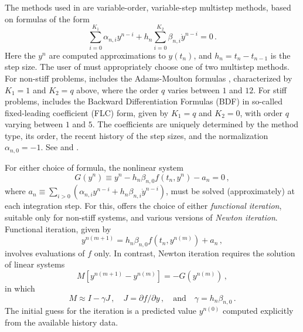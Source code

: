 The methods used in {\cvodes} are variable-order, variable-step multistep
methods, based on formulas of the form
\begin{equation}\label{e:lmm}
 \sum_{i = 0}^{K_1} \alpha_{n,i} y^{n-i} + 
     h_n \sum_{i = 0}^{K_2} \beta_{n,i} {{\dot y}}^{n-i} = 0 \, .
\end{equation}
Here the $y^n$ are computed approximations to $y(t_n)$, and
$h_n = t_n - t_{n-1}$ is the step size.  The user of {\cvodes} must
appropriately choose one of two multistep methods.  For non-stiff problems,
{\cvodes} includes the Adams-Moulton formulas ,
characterized by $K_1 = 1$
and $K_2 = q$ above, where the order $q$ varies between $1$ and $12$.
For stiff problems, {\cvodes} includes the Backward Differentiation
Formulas (BDF)   
in so-called fixed-leading coefficient (FLC) form, given by
$K_1 = q$ and $K_2 = 0$, with order $q$ varying between $1$ and $5$.
The coefficients are uniquely determined by the method type, its
order, the recent history of the step sizes, and the normalization
$\alpha_{n,0} = -1$.  See \cite{ByHi:75} and \cite{JaSD:80}.

For either choice of formula, the nonlinear system
\begin{equation}\label{e:nonlinear}
  G(y^n) \equiv y^n - h_n \beta_{n,0} f(t_n,y^n) - a_n = 0 \, ,
\end{equation}
where $a_n\equiv\sum_{i>0}(\alpha_{n,i}y^{n-i}+h_n\beta_{n,i}{{\dot y}}^{n-i})$, 
must be solved (approximately) at each integration step.  For this, {\cvodes}
offers the choice of either {\em functional iteration}, suitable only
for non-stiff systems, and various versions of {\em Newton iteration}.
Functional iteration, given by
\[ y^{n(m+1)} = h_n \beta_{n,0} f(t_n,y^{n(m)}) + a_n \, , \]
involves evaluations of $f$ only.  In contrast, Newton iteration requires
the solution of linear systems
\begin{equation}\label{e:Newton}
  M [y^{n(m+1)} - y^{n(m)}] = -G(y^{n(m)}) \, ,
\end{equation}
in which
\begin{equation}\label{e:Newtonmat} 
  M \approx I - \gamma J \, ,
  \quad J = \partial f / \partial y \, ,
  \quad \mbox{and} \quad
  \gamma = h_n \beta_{n,0} \, . 
\end{equation}
The initial guess for the iteration is a predicted value $y^{n(0)}$
computed explicitly from the available history data.

